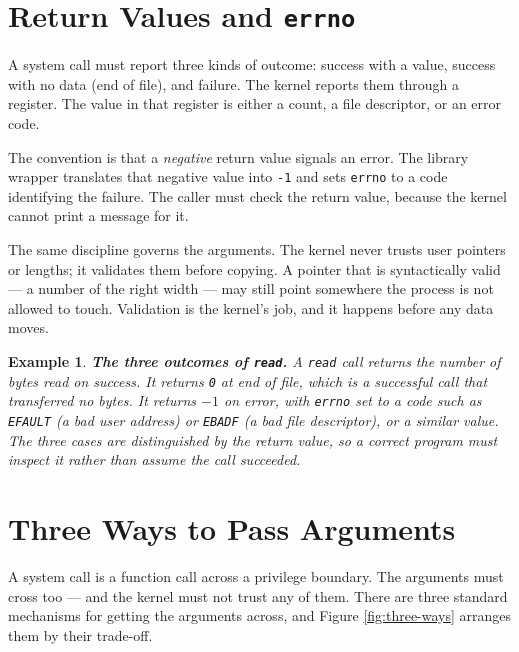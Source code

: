 \documentclass[11pt]{article}
\newtheorem{example}{Example}
\begin{document}
\section{Return Values and \texttt{errno}}

A system call must report three kinds of outcome: success with a value, success
with no data (end of file), and failure. The kernel reports them through a
register. The value in that register is either a count, a file descriptor, or
an error code.

The convention is that a \emph{negative} return value signals an error. The
library wrapper translates that negative value into \texttt{-1} and sets
\texttt{errno} to a code identifying the failure. The caller must check the
return value, because the kernel cannot print a message for it.

The same discipline governs the arguments. The kernel never trusts user
pointers or lengths; it validates them before copying. A pointer that is
syntactically valid --- a number of the right width --- may still point
somewhere the process is not allowed to touch. Validation is the kernel's job,
and it happens before any data moves.

\begin{example}
\textup{\textbf{The three outcomes of \texttt{read}.}} A \texttt{read} call returns the
number of bytes read on success. It returns \texttt{0} at end of file, which is
a successful call that transferred no bytes. It returns $-1$ on error, with
\texttt{errno} set to a code such as \texttt{EFAULT} (a bad user address) or
\texttt{EBADF} (a bad file descriptor), or a similar value. The three cases are
distinguished by the return value, so a correct program must inspect it rather
than assume the call succeeded.
\end{example}

\section{Three Ways to Pass Arguments}

\noindent{}

A system call is a function call across a privilege boundary. The arguments
must cross too --- and the kernel must not trust any of them. There are three
standard mechanisms for getting the arguments across, and Figure
\ref{fig:three-ways} arranges them by their trade-off.
\end{document}
